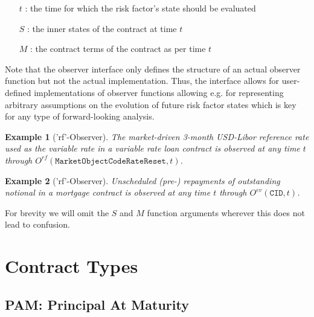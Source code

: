 \documentclass[9pt,oneside]{amsart}
\newtheorem{example}{Example}
\newcommand{\attr}[1]{\texttt{#1}}
\newcommand{\obs}[3]{O^{#1}(#2,#3)}
\begin{document}
\begin{multicols}{2}
\begin{itemize}
	\item[$t$]: the time for which the risk factor’s state should be evaluated

	\item [$S$]: the inner states of the contract at time $t$

	\item [$M$]: the contract terms of the contract as per time $t$
\end{itemize}

Note that the observer interface only defines the structure of an actual observer function but not the actual implementation. Thus, the interface allows for user-defined implementations of observer functions allowing e.g. for representing arbitrary assumptions on the evolution of future risk factor states which is key for any type of forward-looking analysis.

\begin{example}['rf'-Observer] The market-driven 3-month USD-Libor reference rate used as the variable rate in a variable rate loan contract is observed at any time $t$ through $\obs{rf}{\attr{MarketObjectCodeRateReset}}{t}$.
\end{example}

\begin{example}['rf'-Observer] Unscheduled (pre-) repayments of outstanding notional in a mortgage contract is observed at any time $t$ through $\obs{ev}{\attr{CID}}{t}$.
\end{example}

For brevity we will omit the $S$ and $M$ function arguments wherever this does not lead to confusion.




\end{multicols}
\newpage




\section{Contract Types}


\subsection{PAM: Principal At Maturity}\label{sec:pam}


\end{document}
